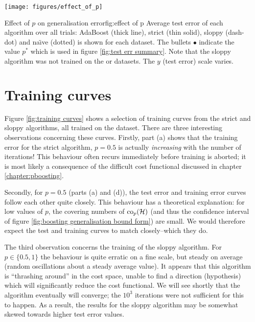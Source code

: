 \begin{linefigure}
\begin{center}
\hspace*{-1cm}\texttt{[image: figures/effect\_of\_p]}
\end{center}
\begin{capt}{Effect of $p$ on generalisation error}{fig:effect of p}
Average test error of each algorithm over all trials: AdaBoost (thick
line), strict (thin solid), sloppy (dash-dot) and na\"{\i}ve (dotted)
is shown for each dataset.  The bullets $\bullet$ indicate the value
$p^{\ast}$ which is used in figure \ref{fig:test err summary}.  Note
that the sloppy algorithm was not trained on the  or
 datasets.  The $y$ (test error) scale varies.
\end{capt}
\end{linefigure}

\section{Training curves}
\label{sec:training curves}

Figure \ref{fig:training curves} shows a selection of training curves
from the strict and sloppy algorithms, all trained on the 
dataset.  There are three interesting observations concerning these
curves.  Firstly, part (a) shows that the training error for the
strict algorithm, $p=0.5$ is actually \emph{increasing} with the number
of iterations!  This behaviour often recurs immediately before
training is aborted; it is most likely a consequence of the difficult
cost functional discussed in chapter \ref{chapter:pboosting}.

Secondly, for $p=0.5$ (parts (a) and (d)), the test error and training
error curves follow each other quite closely.  This behaviour has a
theoretical explanation: for low values of $p$, the covering numbers
of $\mathrm{co}_p(\mathcal{H})$ (and thus the confidence interval of figure
\ref{fig:boosting generalisation bound form}) are small.  We would
therefore expect the test and training curves to match closely--which
they do.

The third observation concerns the training of the sloppy algorithm.
For $p \in \{0.5, 1\}$ the behaviour is quite erratic on a fine scale,
but steady on average (random oscillations about a steady average
value).  It appears that this algorithm is ``thrashing around'' in the
cost space, unable to find a direction (hypothesis) which will
significantly reduce the cost functional.  We will see shortly that
the algorithm eventually will converge; the $10^3$ iterations were not
sufficient for this to happen.  As a result, the results for the
sloppy algorithm may be somewhat skewed towards higher test error
values.

